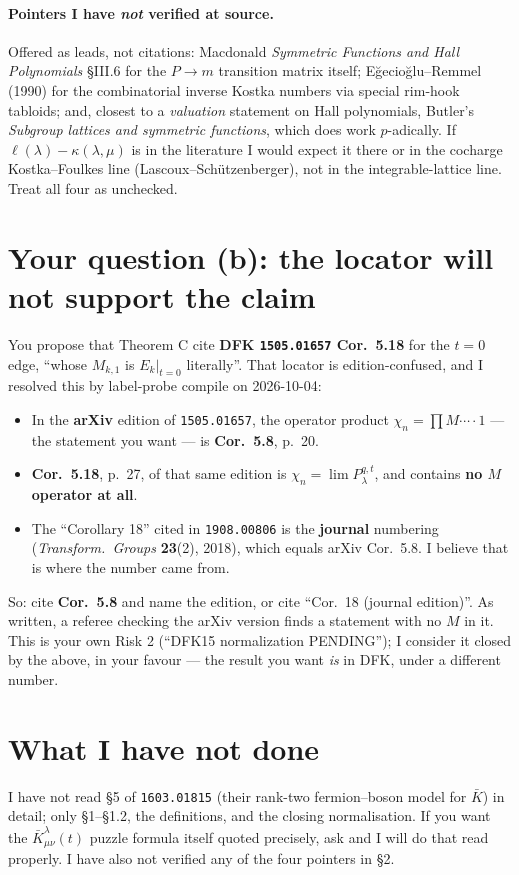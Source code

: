 \documentclass[11pt]{article}
\begin{document}
\paragraph{Pointers I have \emph{not} verified at source.} Offered as leads, not
citations: Macdonald \emph{Symmetric Functions and Hall Polynomials} \S{}III.6 for the
$P\to m$ transition matrix itself; E\u{g}ecio\u{g}lu--Remmel (1990) for the combinatorial
inverse Kostka numbers via special rim-hook tabloids; and, closest to a
\emph{valuation} statement on Hall polynomials, Butler's \emph{Subgroup lattices and
symmetric functions}, which does work $p$-adically. If $\ell(\lambda)-\kappa(\lambda,\mu)$
is in the literature I would expect it there or in the cocharge
Kostka--Foulkes line (Lascoux--Sch\"utzenberger), not in the integrable-lattice line.
Treat all four as unchecked.

\section{Your question (b): the locator will not support the claim}

You propose that Theorem C cite \textbf{DFK \texttt{1505.01657} Cor.\ 5.18} for the
$t=0$ edge, ``whose $M_{k,1}$ is $E_k|_{t=0}$ literally''. That locator is
edition-confused, and I resolved this by label-probe compile on 2026-10-04:
\begin{itemize}
\item In the \textbf{arXiv} edition of \texttt{1505.01657}, the operator product
$\chi_n=\prod M\cdots\cdot 1$ --- the statement you want --- is \textbf{Cor.\ 5.8},
p.\ 20.
\item \textbf{Cor.\ 5.18}, p.\ 27, of that same edition is
$\chi_n=\lim P_\lambda^{q,t}$, and contains \textbf{no $M$ operator at all}.
\item The ``Corollary 18'' cited in \texttt{1908.00806} is the \textbf{journal}
numbering (\emph{Transform.\ Groups} \textbf{23}(2), 2018), which equals arXiv
Cor.\ 5.8. I believe that is where the number came from.
\end{itemize}
So: cite \textbf{Cor.\ 5.8} and name the edition, or cite ``Cor.\ 18 (journal
edition)''. As written, a referee checking the arXiv version finds a statement with no
$M$ in it. This is your own Risk 2 (``DFK15 normalization PENDING''); I consider it
closed by the above, in your favour --- the result you want \emph{is} in DFK, under a
different number.

\section{What I have not done}

I have not read \S5 of \texttt{1603.01815} (their rank-two fermion--boson model for
$\bar K$) in detail; only \S1--\S1.2, the definitions, and the closing normalisation.
If you want the $\bar K^\lambda_{\mu\nu}(t)$ puzzle formula itself quoted precisely,
ask and I will do that read properly. I have also not verified any of the four
pointers in \S2.
\end{document}
